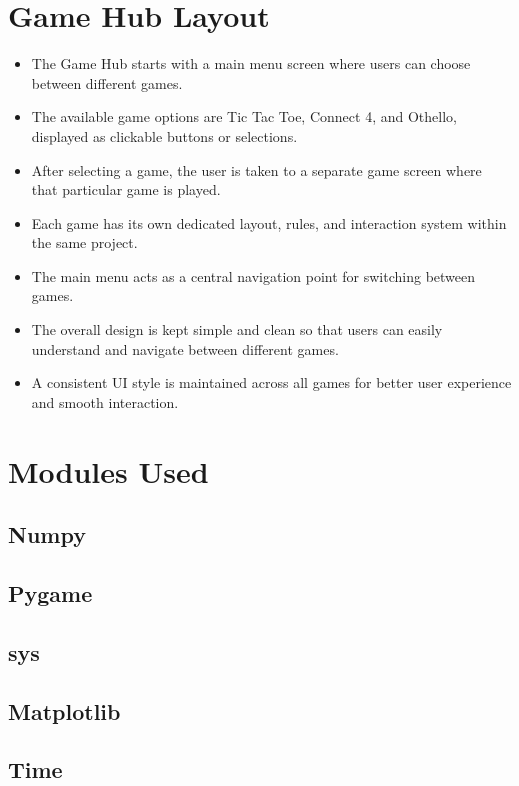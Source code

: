 \documentclass{article}
\begin{document}
\section{Game Hub Layout}
\begin{itemize}
    \item The Game Hub starts with a main menu screen where users can choose between different games.

    \item The available game options are Tic Tac Toe, Connect 4, and Othello, displayed as clickable buttons or selections.

    \item After selecting a game, the user is taken to a separate game screen where that particular game is played.

    \item Each game has its own dedicated layout, rules, and interaction system within the same project.

    \item The main menu acts as a central navigation point for switching between games.

    \item The overall design is kept simple and clean so that users can easily understand and navigate between different games.

    \item A consistent UI style is maintained across all games for better user experience and smooth interaction.
\end{itemize}
\section{Modules Used}
\cite{iitb_latex}
\subsection{Numpy}

\subsection{Pygame}
\subsection{sys}
\subsection{Matplotlib}
\subsection{Time}
\end{document}
